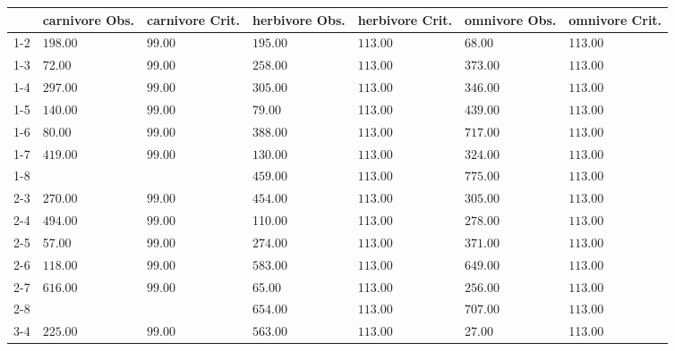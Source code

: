 \begin{table}[ht]
\centering
\begin{tabular}{rllllll}
  \toprule
 & carnivore Obs. & carnivore Crit. & herbivore Obs. & herbivore Crit. & omnivore Obs. & omnivore Crit. \\ 
  \midrule
1-2 & \(\mathbf{198.00}\) & \(\mathbf{99.00}\) & \(\mathbf{195.00}\) & \(\mathbf{113.00}\) & 68.00 & 113.00 \\ 
  1-3 & 72.00 & 99.00 & \(\mathbf{258.00}\) & \(\mathbf{113.00}\) & \(\mathbf{373.00}\) & \(\mathbf{113.00}\) \\ 
  1-4 & \(\mathbf{297.00}\) & \(\mathbf{99.00}\) & \(\mathbf{305.00}\) & \(\mathbf{113.00}\) & \(\mathbf{346.00}\) & \(\mathbf{113.00}\) \\ 
  1-5 & \(\mathbf{140.00}\) & \(\mathbf{99.00}\) & 79.00 & 113.00 & \(\mathbf{439.00}\) & \(\mathbf{113.00}\) \\ 
  1-6 & 80.00 & 99.00 & \(\mathbf{388.00}\) & \(\mathbf{113.00}\) & \(\mathbf{717.00}\) & \(\mathbf{113.00}\) \\ 
  1-7 & \(\mathbf{419.00}\) & \(\mathbf{99.00}\) & \(\mathbf{130.00}\) & \(\mathbf{113.00}\) & \(\mathbf{324.00}\) & \(\mathbf{113.00}\) \\ 
  1-8 &  &  & \(\mathbf{459.00}\) & \(\mathbf{113.00}\) & \(\mathbf{775.00}\) & \(\mathbf{113.00}\) \\ 
  2-3 & \(\mathbf{270.00}\) & \(\mathbf{99.00}\) & \(\mathbf{454.00}\) & \(\mathbf{113.00}\) & \(\mathbf{305.00}\) & \(\mathbf{113.00}\) \\ 
  2-4 & \(\mathbf{494.00}\) & \(\mathbf{99.00}\) & 110.00 & 113.00 & \(\mathbf{278.00}\) & \(\mathbf{113.00}\) \\ 
  2-5 & 57.00 & 99.00 & \(\mathbf{274.00}\) & \(\mathbf{113.00}\) & \(\mathbf{371.00}\) & \(\mathbf{113.00}\) \\ 
  2-6 & \(\mathbf{118.00}\) & \(\mathbf{99.00}\) & \(\mathbf{583.00}\) & \(\mathbf{113.00}\) & \(\mathbf{649.00}\) & \(\mathbf{113.00}\) \\ 
  2-7 & \(\mathbf{616.00}\) & \(\mathbf{99.00}\) & 65.00 & 113.00 & \(\mathbf{256.00}\) & \(\mathbf{113.00}\) \\ 
  2-8 &  &  & \(\mathbf{654.00}\) & \(\mathbf{113.00}\) & \(\mathbf{707.00}\) & \(\mathbf{113.00}\) \\ 
  3-4 & \(\mathbf{225.00}\) & \(\mathbf{99.00}\) & \(\mathbf{563.00}\) & \(\mathbf{113.00}\) & 27.00 & 113.00 \\ 

\end{tabular}
\end{table}
